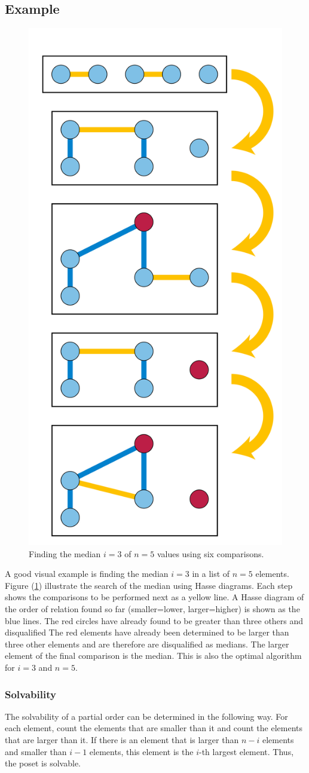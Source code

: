 \documentclass[10pt,journal,compsoc]{IEEEtran}
\begin{document}
\subsection{Example}
\begin{figure}[h!]
  \centering
  \includegraphics[width=0.5\columnwidth]{figures/Median_of_5.svg.png}
  \caption{Finding the median $i=3$ of $n=5$ values using six comparisons.}
  \label{fig:median_of_5}
\end{figure}
A good visual example is finding the median $i=3$ in a list of $n=5$ elements. Figure
(\ref{fig:median_of_5}) illustrate the search of the median using Hasse diagrams. Each step shows
the comparisons to be performed next as a yellow line. A Hasse diagram of the order of relation
found so far (smaller=lower, larger=higher) is shown as the blue lines. The red circles have already
found to be greater than three others and disqualified The red elements have already been determined
to be larger than three other elements and are therefore are disqualified as medians. The larger
element of the final comparison is the median. This is also the optimal algorithm for $i=3$ and
$n=5$.


\subsubsection{Solvability}
The solvability of a partial order can be determined in the following way. For each element, count
the elements that are smaller than it and count the elements that are larger than it. If there is an
element that is larger than $n-i$ elements and smaller than $i-1$ elements, this element is the
$i$-th largest element. Thus, the poset is solvable.
\end{document}
